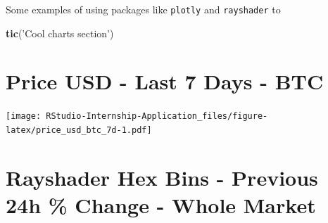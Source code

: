 \documentclass[
]{book}
\newenvironment{Shaded}{\begin{snugshade}}{\end{snugshade}}
\newcommand{\DataTypeTok}[1]{\textcolor[rgb]{0.13,0.29,0.53}{#1}}
\newcommand{\FloatTok}[1]{\textcolor[rgb]{0.00,0.00,0.81}{#1}}
\newcommand{\KeywordTok}[1]{\textcolor[rgb]{0.13,0.29,0.53}{\textbf{#1}}}
\newcommand{\NormalTok}[1]{#1}
\newcommand{\OperatorTok}[1]{\textcolor[rgb]{0.81,0.36,0.00}{\textbf{#1}}}
\newcommand{\StringTok}[1]{\textcolor[rgb]{0.31,0.60,0.02}{#1}}
\begin{document}
Some examples of using packages like \texttt{plotly} \citep{R-plotly} and \texttt{rayshader} \citep{R-rayshader} to

\begin{Shaded}
\begin{Highlighting}[]
\KeywordTok{tic}\NormalTok{(}\StringTok{'Cool charts section'}\NormalTok{)}
\end{Highlighting}
\end{Shaded}

\hypertarget{price-usd---last-7-days---btc}{%
\section{Price USD - Last 7 Days - BTC}\label{price-usd---last-7-days---btc}}

\begin{Shaded}
\end{Shaded}

\texttt{[image: RStudio-Internship-Application\_files/figure-latex/price\_usd\_btc\_7d-1.pdf]}

\hypertarget{rayshader-hex-bins---previous-24h-change---whole-market}{%
\section{Rayshader Hex Bins - Previous 24h \% Change - Whole Market}\label{rayshader-hex-bins---previous-24h-change---whole-market}}
\end{document}
